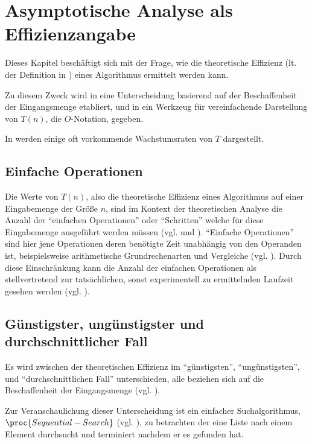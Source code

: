 \chapter{Asymptotische Analyse als Effizienzangabe}
\label{cha:asymptotic-analysis}

Dieses Kapitel beschäftigt sich mit der Frage, wie die theoretische Effizienz (lt. der Definition in ) eines Algorithmus ermittelt werden kann.

Zu diesem Zweck wird in  eine Unterscheidung basierend auf der Beschaffenheit der Eingangsmenge etabliert, und in  ein Werkzeug für vereinfachende Darstellung von $T(n)$, die $O$-Notation, gegeben.

In  werden einige oft vorkommende Wachstumsraten von $T$ dargestellt.

\section{Einfache Operationen}

Die Werte von $T(n)$, also die theoretische Effizienz eines Algorithmus auf einer Eingabemenge der Größe $n$, sind im Kontext der theoretischen Analyse die Anzahl der \enquote{einfachen Operationen} oder \enquote{Schritten} welche für diese Eingabemenge ausgeführt werden müssen (vgl. \cite[25]{clrs2001} und \cite[18f]{hsr1997}). \enquote{Einfache Operationen} sind hier jene Operationen deren benötigte Zeit unabhängig von den Operanden ist, beispielsweise arithmetische Grundrechenarten und Vergleiche (vgl. \cite[55]{sha2011}). Durch diese Einschränkung kann die Anzahl der einfachen Operationen als stellvertretend zur tatsächlichen, sonst experimentell zu ermittelnden Laufzeit gesehen werden (vgl. \cite[55]{sha2011}).

\section{Günstigster, ungünstigster und durchschnittlicher Fall}
\label{sec:asymptotic-cases}

Es wird zwi\-schen der theoretischen Effizienz im \enquote{günstigsten}, \enquote{ungünstigsten}, und \enquote{durchschnittlichen Fall} unterschieden, alle beziehen sich auf die Beschaffenheit der Eingangsmenge (vgl. \cite[28]{hsr1997}).

Zur Veranschaulichung dieser Unterscheidung ist ein einfacher Suchalgorithmus, $\proc{Sequential-Search}$ (vgl. \cite[396]{taocp3}), zu betrachten der eine Liste nach einem Element durchsucht und terminiert nachdem er es gefunden hat.

